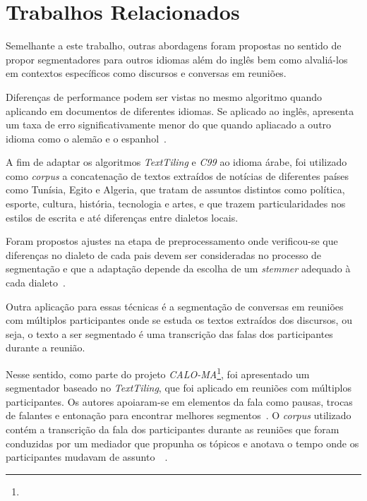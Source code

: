 \section{Trabalhos Relacionados}
	\label{sec:trabalhos}


Semelhante a este trabalho, outras abordagens foram propostas no sentido de propor segmentadores para outros idiomas além do inglês bem como alvaliá-los em contextos específicos como discursos e conversas em reuniões.

Diferenças de performance podem ser vistas no mesmo algoritmo quando aplicando em documentos de diferentes idiomas. Se aplicado ao inglês, apresenta um taxa de erro significativamente menor do que quando apliacado a outro idioma como o alemão e o espanhol~\cite{Kern2009}.


A fim de adaptar os algoritmos \textit{TextTiling} e \textit{C99} ao idioma árabe, foi utilizado como \textit{corpus} a concatenação de textos extraídos de notícias de diferentes países como Tunísia, Egito e Algeria, que tratam de assuntos distintos como política, esporte, cultura, história, tecnologia e artes, e que trazem particularidades nos estilos de escrita e até diferenças entre dialetos locais. 

Foram propostos ajustes na etapa de preprocessamento onde verificou-se que diferenças no dialeto de cada pais devem ser consideradas no processo de segmentação e que a adaptação depende da escolha de um \textit{stemmer} adequado à cada dialeto~\cite{CHAIBI2014}.



Outra aplicação para essas técnicas é a segmentação de conversas em reuniões com múltiplos participantes onde se estuda os textos extraídos dos discursos, ou seja, o texto a ser segmentado é uma transcrição das falas dos participantes durante a reunião.


Nesse sentido, como parte do projeto \textit{CALO-MA}\footnote{\urlcaloproject}, foi apresentado um segmentador baseado no  \textit{TextTiling}, que foi aplicado em reuniões com múltiplos participantes. Os autores apoiaram-se em elementos da fala como pausas, trocas de falantes e entonação para encontrar melhores segmentos~\cite{Galley2003}. O \textit{corpus} utilizado contém a transcrição da fala dos participantes durante as reuniões que foram conduzidas por um mediador que propunha os tópicos e anotava o tempo onde os participantes mudavam de assunto~\cite{Banerjee2006}~\cite{Tur2010}. 


